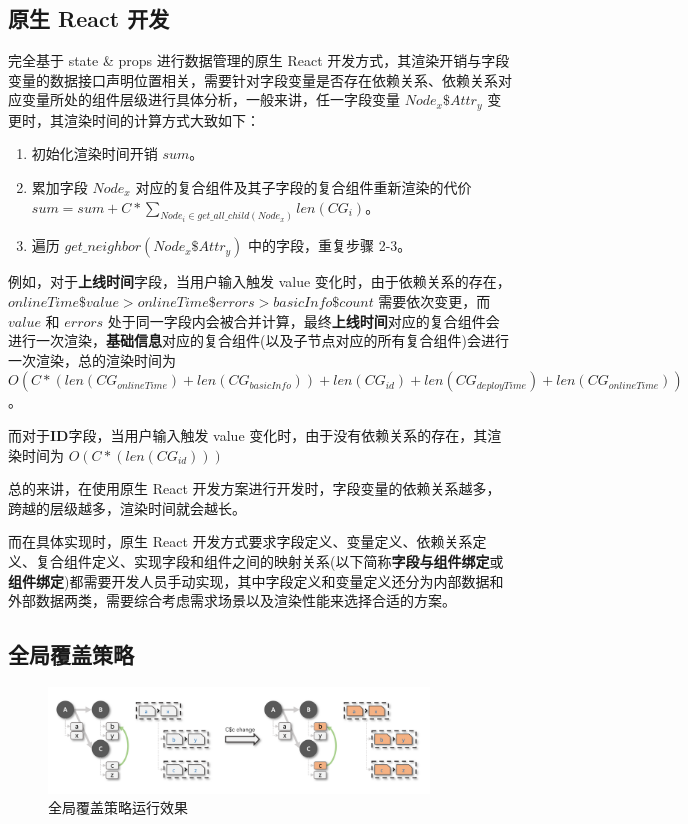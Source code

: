 \documentclass[winfonts,master,twoside]{njuthesis}
\begin{document}
\subsection{原生 React 开发}

完全基于 state \& props 进行数据管理的原生 React 开发方式，其渲染开销与字段变量的数据接口声明位置相关，需要针对字段变量是否存在依赖关系、依赖关系对应变量所处的组件层级进行具体分析，一般来讲，任一字段变量 $Node_x\$Attr_y$ 变更时，其渲染时间的计算方式大致如下：

\begin{enumerate}
    \item 初始化渲染时间开销 $sum$。
    \item 累加字段 $Node_x$ 对应的复合组件及其子字段的复合组件重新渲染的代价 $sum=sum+C*\sum_{Node_i\in get\_all\_child(Node_x)}len(CG_i)$。
    \item 遍历 $get\_neighbor(Node_x\$Attr_y)$ 中的字段，重复步骤 2-3。
\end{enumerate}

例如，对于\textbf{上线时间}字段，当用户输入触发 value 变化时，由于依赖关系的存在，$onlineTime\$value > onlineTime\$errors > basicInfo\$count$ 需要依次变更，而 $value$ 和 $errors$ 处于同一字段内会被合并计算，最终\textbf{上线时间}对应的复合组件会进行一次渲染，\textbf{基础信息}对应的复合组件(以及子节点对应的所有复合组件)会进行一次渲染，总的渲染时间为 $O(C*(len(CG_{onlineTime})+len(CG_{basicInfo}))+len(CG_{id})+len(CG_{deployTime})+len(CG_{onlineTime}))$。

而对于\textbf{ID}字段，当用户输入触发 value 变化时，由于没有依赖关系的存在，其渲染时间为 $O(C*(len(CG_{id})))$

总的来讲，在使用原生 React 开发方案进行开发时，字段变量的依赖关系越多，跨越的层级越多，渲染时间就会越长。

而在具体实现时，原生 React 开发方式要求字段定义、变量定义、依赖关系定义、复合组件定义、实现字段和组件之间的映射关系(以下简称\textbf{字段与组件绑定}或\textbf{组件绑定})都需要开发人员手动实现，其中字段定义和变量定义还分为内部数据和外部数据两类，需要综合考虑需求场景以及渲染性能来选择合适的方案。

\subsection{全局覆盖策略}

\begin{figure}[h]
    \centering
    \includegraphics[width=0.9\textwidth]{figure/chapter-2/global-cover.png}
    \caption{全局覆盖策略运行效果}
    \label{global-cover}
\end{figure}
\end{document}
